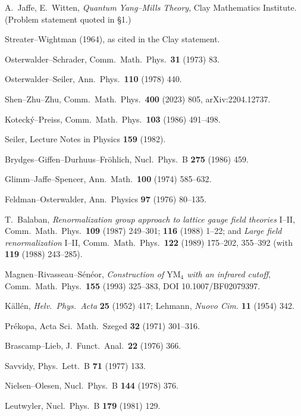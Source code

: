 {\small
\begin{enumerate}[label={[\arabic*]},leftmargin=2.4em,itemsep=1.5pt,topsep=2pt,parsep=0pt]

\item A.~Jaffe, E.~Witten, \emph{Quantum Yang--Mills Theory}, Clay Mathematics Institute.
  (Problem statement quoted in  \S1.)
\item Streater--Wightman (1964), as cited in the Clay statement.
\item Osterwalder--Schrader, Comm.\ Math.\ Phys.\ \textbf{31} (1973) 83.
\item Osterwalder--Seiler, Ann.\ Phys.\ \textbf{110} (1978) 440.
\item Shen--Zhu--Zhu, Comm.\ Math.\ Phys.\ \textbf{400} (2023) 805, arXiv:2204.12737.
\item Kotecký--Preiss, Comm.\ Math.\ Phys.\ \textbf{103} (1986) 491--498.
\item Seiler, Lecture Notes in Physics \textbf{159} (1982).
\item Brydges--Giffen--Durhuus--Fröhlich, Nucl.\ Phys.\ B \textbf{275} (1986) 459.
\item Glimm--Jaffe--Spencer, Ann.\ Math.\ \textbf{100} (1974) 585--632.
\item Feldman--Osterwalder, Ann.\ Physics \textbf{97} (1976) 80--135.
\item T.~Balaban, \emph{Renormalization group approach to lattice gauge field theories} I--II,
  Comm.\ Math.\ Phys.\ \textbf{109} (1987) 249--301; \textbf{116} (1988) 1--22; and
  \emph{Large field renormalization} I--II, Comm.\ Math.\ Phys.\ \textbf{122} (1989) 175--202,
  355--392 (with \textbf{119} (1988) 243--285).
\item Magnen--Rivasseau--Sénéor, \emph{Construction of $\mathrm{YM}_4$ with an infrared cutoff},
  Comm.\ Math.\ Phys.\ \textbf{155} (1993) 325--383, DOI 10.1007/BF02079397.
\item Källén, \emph{Helv.\ Phys.\ Acta} \textbf{25} (1952) 417; Lehmann,
  \emph{Nuovo Cim.} \textbf{11} (1954) 342.
\item Prékopa, Acta Sci.\ Math.\ Szeged \textbf{32} (1971) 301--316.
\item Brascamp--Lieb, J.\ Funct.\ Anal.\ \textbf{22} (1976) 366.
\item Savvidy, Phys.\ Lett.\ B \textbf{71} (1977) 133.
\item Nielsen--Olesen, Nucl.\ Phys.\ B \textbf{144} (1978) 376.
\item Leutwyler, Nucl.\ Phys.\ B \textbf{179} (1981) 129.

\end{enumerate}}
